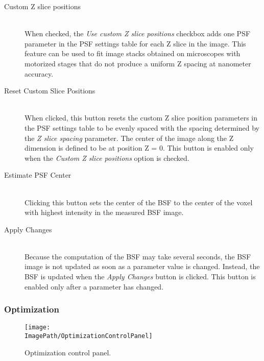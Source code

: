 \documentclass[11pt,titlepage,twoside]{article}
\begin{document}
\begin{description}

  \item[Custom Z slice positions] \hfill \\
  
When checked, the \emph{Use custom Z slice positions} checkbox adds one PSF parameter in the PSF settings table for each Z slice in the image. This feature can be used to fit image stacks obtained on microscopes with motorized stages that do not produce a uniform Z spacing at nanometer accuracy.

  \item[Reset Custom Slice Positions] \hfill \\
  
When clicked, this button resets the custom Z slice position parameters in the PSF settings table to be evenly spaced with the spacing determined by the \emph{Z slice spacing} parameter. The center of the image along the Z dimension is defined to be at position Z = 0. This button is enabled only when the \emph{Custom Z slice positions} option is checked.

  \item[Estimate PSF Center] \hfill \\
  
Clicking this button sets the center of the BSF to the center of the voxel with highest intensity in the measured BSF image.

  \item[Apply Changes] \hfill \\
  
  Because the computation of the BSF may take several seconds, the BSF image is not updated as soon as a parameter value is changed. Instead, the BSF is updated when the \emph{Apply Changes} button is clicked. This button is enabled only after a parameter has changed.

\end{description}

\subsubsection{Optimization}
\label{sec:Optimization}

\begin{figure}[h]
  \centering
  \texttt{[image: \\ImagePath/OptimizationControlPanel]}
  \caption{Optimization control panel.}
  \label{fig:OptimizationControlPanel}
\end{figure}
\end{document}
